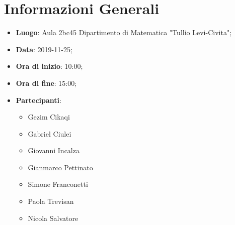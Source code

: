 \section{Informazioni Generali}
	\begin{itemize}
		\item \textbf {Luogo}: Aula 2bc45 Dipartimento di Matematica "Tullio Levi-Civita";
		\item \textbf {Data}: 2019-11-25;
		\item \textbf {Ora di inizio}: 10:00;
		\item \textbf {Ora di fine}: 15:00;
		\item \textbf {Partecipanti}: 
			\begin{itemize}
				\item Gezim Cikaqi
				\item Gabriel Ciulei
				\item Giovanni Incalza
				\item Gianmarco Pettinato
				\item Simone Franconetti
				\item Paola Trevisan
				\item Nicola Salvatore
			\end{itemize}
	\end{itemize}